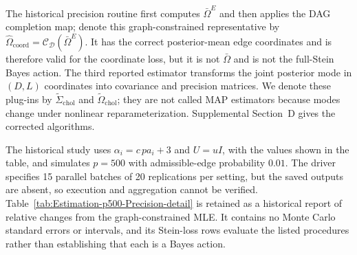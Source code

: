 \documentclass[12pt]{article}
\newcommand{\D}{\mathcal{D}}
\theoremstyle{plain}
\theoremstyle{definition}
\theoremstyle{remark}
\begin{document}
The historical precision routine first computes \(\bar\Omega^E\) and
then applies the DAG completion map; denote this graph-constrained
representative by
\(\widehat\Omega_{\mathrm{coord}}
=\mathcal{C}_{\D}(\bar\Omega^E)\).
It has the correct posterior-mean edge coordinates and is therefore
valid for the coordinate loss, but it is not \(\bar\Omega\) and is not
the full-Stein Bayes action.  The third reported estimator transforms
the joint posterior mode in \((D,L)\) coordinates into covariance and
precision matrices.  We denote these plug-ins by
\(\widetilde\Sigma_{\mathrm{chol}}\) and
\(\widetilde\Omega_{\mathrm{chol}}\); they are not called MAP
estimators because modes change under nonlinear reparameterization.
Supplemental Section~D gives the corrected algorithms.

The historical study uses \(\alpha_i=c\,pa_i+3\) and
\(U=uI\), with the values shown in the table, and simulates
\(p=500\) with admissible-edge probability \(0.01\).  The driver
specifies 15 parallel batches of 20 replications per setting, but the
saved outputs are absent, so execution and aggregation cannot be
verified.  Table~\ref{tab:Estimation-p500-Precision-detail} is retained
as a historical report of relative changes from the graph-constrained
MLE.  It contains no Monte Carlo standard errors or intervals, and its
Stein-loss rows evaluate the listed procedures rather than establishing
that each is a Bayes action.
\end{document}
